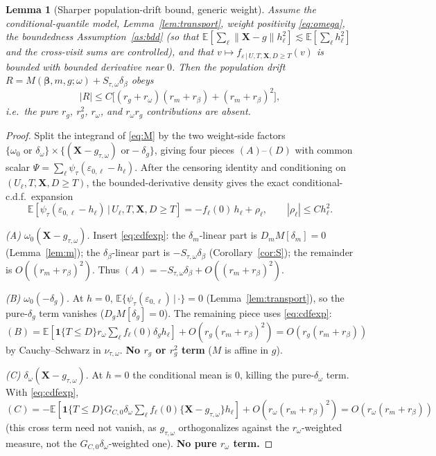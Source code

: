 \documentclass[11pt]{article}
\newtheorem{lemma}{Lemma}
\theoremstyle{remark}\newtheorem{remark}{Remark}
\newcommand{\E}{\mathbb{E}}
\newcommand{\X}{\bm{X}}
\newcommand{\bbeta}{\bm{\beta}}
\newcommand{\indc}[1]{\mathbf{1}\{#1\}}
\newcommand{\given}{\,\vert\,}
\newcommand{\rom}{r_{\omega}}
\begin{document}
\begin{lemma}[Sharper population-drift bound, generic weight]\label{lem:sharp}
Assume the conditional-quantile model, Lemma~\ref{lem:transport}, weight
positivity \eqref{eq:omega}, the boundedness Assumption~\ref{as:bdd} (so that
$\E[\sum_\ell\|\X-g\|h_\ell^2]\lesssim\E[\sum_\ell h_\ell^2]$ and the cross-visit
sums are controlled), and that
$v\mapsto f_{\varepsilon\given U,T,\X,D\ge T}(v)$ is bounded with bounded
derivative near $0$. Then the population drift
$R=M(\bbeta,m,g;\omega)+S_{\tau,\omega}\delta_\beta$ obeys
\[
|R|\le C\big[(r_g+r_\omega)(r_m+r_\beta)+(r_m+r_\beta)^2\big],
\]
i.e.\ the pure $r_g$, $r_g^2$, $r_\omega$, and $r_\omega r_g$ contributions are
\emph{absent}.
\end{lemma}
\begin{proof}
Split the integrand of \eqref{eq:M} by the two weight-side factors
$\{\omega_0\text{ or }\delta_\omega\}\times\{(\X-g_{\tau,\omega})\text{ or
}-\delta_g\}$, giving four pieces $(A)$--$(D)$ with common scalar
$\Psi=\sum_\ell\psi_\tau(\varepsilon_{0,\ell}-h_\ell)$. After the censoring
identity and conditioning on $(U_\ell,T,\X,D\ge T)$, the bounded-derivative
density gives the exact conditional-c.d.f.\ expansion
\begin{equation}
\E[\psi_\tau(\varepsilon_{0,\ell}-h_\ell)\given U_\ell,T,\X,D\ge T]
=-f_\ell(0)\,h_\ell+\rho_\ell,\qquad |\rho_\ell|\le C h_\ell^2.
\label{eq:cdfexp}
\end{equation}

\emph{(A) $\omega_0(\X-g_{\tau,\omega})$.} Insert \eqref{eq:cdfexp}: the
$\delta_m$-linear part is $D_mM[\delta_m]=0$ (Lemma~\ref{lem:m}); the
$\delta_\beta$-linear part is $-S_{\tau,\omega}\delta_\beta$
(Corollary~\ref{cor:S}); the remainder is $O((r_m+r_\beta)^2)$. Thus
$(A)=-S_{\tau,\omega}\delta_\beta+O((r_m+r_\beta)^2)$.

\emph{(B) $\omega_0(-\delta_g)$.} At $h=0$,
$\E\{\psi_\tau(\varepsilon_{0,\ell})\given\cdot\}=0$
(Lemma~\ref{lem:transport}), so the pure-$\delta_g$ term vanishes
($D_gM[\delta_g]=0$). The remaining piece uses \eqref{eq:cdfexp}:
$(B)=\E[\indc{T\le D}\rom\sum_\ell f_\ell(0)\delta_g h_\ell]+O(r_g(r_m+r_\beta)^2)
=O(r_g(r_m+r_\beta))$ by Cauchy--Schwarz in $\nu_{\tau,\omega}$. \textbf{No
$r_g$ or $r_g^2$ term} ($M$ is affine in $g$).

\emph{(C) $\delta_\omega(\X-g_{\tau,\omega})$.} At $h=0$ the conditional mean is
$0$, killing the pure-$\delta_\omega$ term. With \eqref{eq:cdfexp},
$(C)=-\E[\indc{T\le D}G_{C,0}\delta_\omega\sum_\ell f_\ell(0)
\{\X-g_{\tau,\omega}\}h_\ell]+O(r_\omega(r_m+r_\beta)^2)=O(r_\omega(r_m+r_\beta))$
(this cross term need not vanish, as $g_{\tau,\omega}$ orthogonalizes against the
$\rom$-weighted measure, not the $G_{C,0}\delta_\omega$-weighted one).
\textbf{No pure $r_\omega$ term.}


\end{proof}
\end{document}
